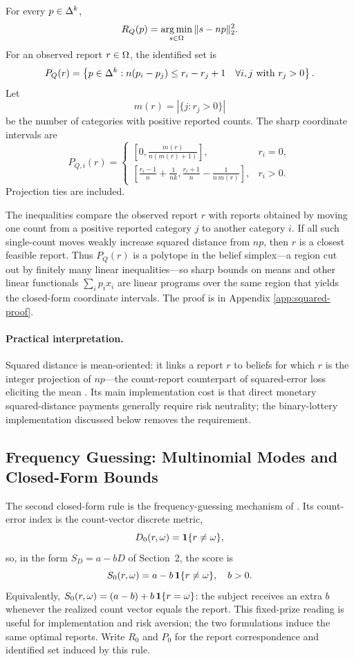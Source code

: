 \begin{proposition}\label{prop:quadratic}
For every \(p\in\Delta^k\),
\[
R_Q(p)
=
\operatorname*{arg\,min}_{s\in\Omega}\|s-np\|_2^2.
\]
For an observed report \(r\in\Omega\), the identified set is
\[
P_Q(r)
=
\left\{
p\in\Delta^k:
n(p_i-p_j)\le r_i-r_j+1
\quad
\forall i,j\text{ with }r_j>0
\right\}.
\]
Let
\[
m(r)=|\{j:r_j>0\}|
\]
be the number of categories with positive reported counts.
The sharp coordinate intervals are
\[
P_{Q,i}(r)=
\begin{cases}
\displaystyle
\left[0,\frac{m(r)}{n(m(r)+1)}\right],
& r_i=0,\\[1.2em]
\displaystyle
\left[
\frac{r_i-1}{n}+\frac{1}{nk},
\frac{r_i+1}{n}-\frac{1}{n\,m(r)}
\right],
& r_i>0.
\end{cases}
\]
Projection ties are included.
\end{proposition}

The inequalities compare the observed report \(r\) with reports obtained by moving one count from a positive reported category \(j\) to another category \(i\).
If all such single-count moves weakly increase squared distance from \(np\), then \(r\) is a closest feasible report.
Thus \(P_Q(r)\) is a polytope in the belief simplex---a region cut out by finitely many linear inequalities---so sharp bounds on means and other linear functionals \(\sum_i p_ix_i\) are linear programs over the same region that yields the closed-form coordinate intervals.
The proof is in Appendix \ref{app:squared-proof}.

\paragraph{Practical interpretation.}
Squared distance is mean-oriented: it links a report \(r\) to beliefs for which \(r\) is the integer projection of \(np\)---the count-report counterpart of squared-error loss eliciting the mean \citep{Gneiting2011}.
Its main implementation cost is that direct monetary squared-distance payments generally require risk neutrality; the binary-lottery implementation discussed below removes the requirement.

\subsection{Frequency Guessing: Multinomial Modes and Closed-Form Bounds}

The second closed-form rule is the frequency-guessing mechanism of \citet{SchlagTremewan2021}.
Its count-error index is the count-vector discrete metric,
\[
D_0(r,\omega)=\mathbf{1}\{r\ne\omega\},
\]
so, in the form \(S_D=a-bD\) of Section~2, the score is
\[
S_0(r,\omega)=a-b\,\mathbf{1}\{r\ne\omega\},
\quad b>0.
\]
Equivalently, \(S_0(r,\omega)=(a-b)+b\,\mathbf{1}\{r=\omega\}\): the subject receives an extra \(b\) whenever the realized count vector equals the report.
This fixed-prize reading is useful for implementation and risk aversion; the two formulations induce the same optimal reports.
Write \(R_0\) and \(P_0\) for the report correspondence and identified set induced by this rule.

